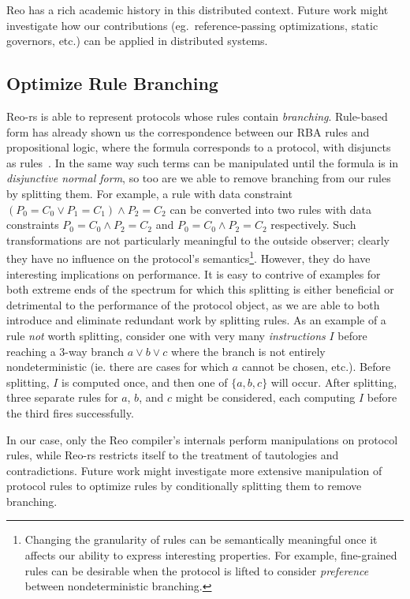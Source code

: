 Reo has a rich academic history in this distributed context. Future work might investigate how our contributions (eg.\ reference-passing optimizations, static governors, etc.) can be applied in distributed systems.


\subsection{Optimize Rule Branching}
\label{sec:future_branches}
Reo-rs is able to represent protocols whose rules contain \textit{branching}. Rule-based form has already shown us the correspondence between our RBA rules and propositional logic, where the formula corresponds to a protocol, with disjuncts as rules~\cite{dokter2018rule}. In the same way such terms can be manipulated until the formula is in \textit{disjunctive normal form}, so too are we able to remove branching from our rules by splitting them. For example, a rule with data constraint $(P_0=C_0\vee{}P_1=C_1)\wedge{}P_2=C_2$ can be converted into two rules with data constraints $P_0=C_0\wedge{}P_2=C_2$ and $P_0=C_0\wedge{}P_2=C_2$ respectively. Such transformations are not particularly meaningful to the outside observer; clearly they have  no influence on the protocol's semantics\footnote{Changing the granularity of rules can be semantically meaningful once it affects our ability to express interesting properties. For example, fine-grained rules can be desirable when the protocol is lifted to consider \textit{preference} between nondeterministic branching.}. However, they do have interesting implications on performance. It is easy to contrive of examples for both extreme ends of the spectrum for which this splitting is either beneficial or detrimental to the performance of the protocol object, as we are able to both introduce and eliminate redundant work by splitting rules. As an example of a rule \textit{not} worth splitting, consider one with very many \textit{instructions} $I$ before reaching a 3-way branch $a\vee{}b\vee{}c$ where the branch is not entirely nondeterministic (ie. there are cases for which $a$ cannot be chosen, etc.). Before splitting, $I$ is computed once, and then one of $\{a,b,c\}$ will occur. After splitting, three separate rules for $a$, $b$, and $c$ might be considered, each computing $I$ before the third fires successfully.

In our case, only the Reo compiler's internals perform manipulations on protocol rules, while Reo-rs restricts itself to the treatment of tautologies and contradictions. Future work might investigate more extensive manipulation of protocol rules to optimize rules by conditionally splitting them to remove branching.

